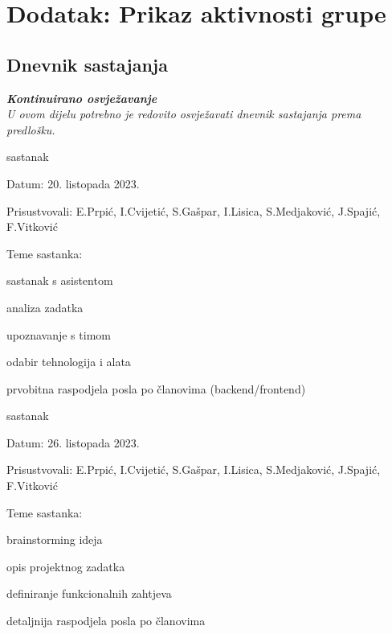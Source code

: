 \chapter*{Dodatak: Prikaz aktivnosti grupe}
		
		\section*{Dnevnik sastajanja}
		
		\textbf{\textit{Kontinuirano osvježavanje}}\\
		
		 \textit{U ovom dijelu potrebno je redovito osvježavati dnevnik sastajanja prema predlošku.}
		
		\begin{packed_enum}
			\item  sastanak
			
			\item[] \begin{packed_item}
				\item Datum: 20. listopada 2023.
				\item Prisustvovali: E.Prpić, I.Cvijetić, S.Gašpar, I.Lisica, S.Medjaković, J.Spajić, F.Vitković
				\item Teme sastanka:
				\begin{packed_item}
					\item  sastanak s asistentom
					\item  analiza zadatka
					\item  upoznavanje s timom
					\item  odabir tehnologija i alata
					\item  prvobitna raspodjela posla po članovima (backend/frontend)
				\end{packed_item}
			\end{packed_item}
			
			\item  sastanak
			\item[] \begin{packed_item}
				\item Datum: 26. listopada 2023.
				\item Prisustvovali: E.Prpić, I.Cvijetić, S.Gašpar, I.Lisica, S.Medjaković, J.Spajić, F.Vitković
				\item Teme sastanka:
				\begin{packed_item}
					\item  brainstorming ideja
					\item  opis projektnog zadatka
					\item  definiranje funkcionalnih zahtjeva
					\item  detaljnija raspodjela posla po članovima
				\end{packed_item}
			\end{packed_item}
			

\end{packed_enum}
